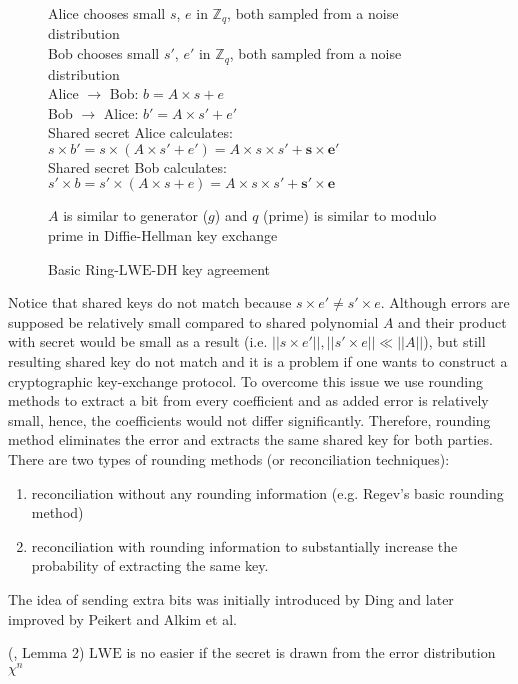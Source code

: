 \begin{figure}[H]
    \centering
	Alice chooses {small} $s$, $e$ in ${\mathbb{Z}}_{q}$, both sampled from a noise distribution\\
	Bob chooses {small} $s'$, $e'$ in ${\mathbb{Z}}_{q}$, both sampled from a noise distribution\\
	Alice $\to$ Bob: $b = A \times s + e$\\
	Bob $\to$ Alice: $b' = A \times s' + e'$\\
	Shared secret Alice calculates: $s \times b' = s \times (A \times s' + e') = A \times s   \times s' + \boldsymbol{s \times e'}$\\
	Shared secret Bob calculates: $s' \times b = s' \times (A \times s + e) = A \times s   \times s' + \boldsymbol{s' \times e}$
	\caption{Basic Ring-$\mathrm{LWE\text{-}DH}$ key agreement}
	{$A$ is similar to generator ($g$) and $q$ (prime) is similar to modulo prime in Diffie-Hellman key exchange}
\end{figure}

Notice that shared keys do not match because ${s} \times {e}' \neq {s}' \times {e}$. Although errors are supposed be relatively small compared to shared polynomial ${A}$ and their product with secret would be small as a result (i.e. $||{s} \times {e}'|| , ||{s}' \times {e}|| \ll ||A||$), but still resulting shared key do not match and it is a problem if one wants to construct a cryptographic key-exchange protocol. To overcome this issue we use rounding methods to extract a bit from every coefficient and as added error is relatively small, hence, the coefficients would not differ significantly. Therefore, rounding method eliminates the error and extracts the same shared key for both parties. There are two types of rounding methods (or reconciliation techniques): 

\begin{enumerate}
    \item reconciliation without any rounding information (e.g. Regev's basic rounding method)
    \item reconciliation with rounding information to substantially increase the probability of extracting the same key.
\end{enumerate}

The idea of sending extra bits was initially introduced by Ding and later improved by Peikert and Alkim et al.

\begin{lemma}
    \normalfont
    (\cite{DBLP:conf/crypto/ApplebaumCPS09}, Lemma 2)
    $\mathrm{LWE}$ is no easier if the secret is drawn from the error distribution $\chi^{n}$
\end{lemma}


